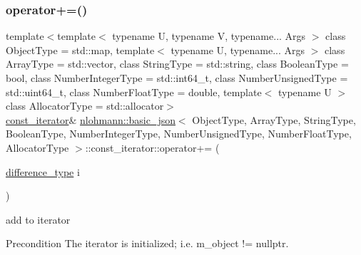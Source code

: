 \subsubsection{\texorpdfstring{operator+=()}{operator+=()}}
{\footnotesize\ttfamily template$<$template$<$ typename U, typename V, typename... Args $>$ class Object\+Type = std\+::map, template$<$ typename U, typename... Args $>$ class Array\+Type = std\+::vector, class String\+Type  = std\+::string, class Boolean\+Type  = bool, class Number\+Integer\+Type  = std\+::int64\+\_\+t, class Number\+Unsigned\+Type  = std\+::uint64\+\_\+t, class Number\+Float\+Type  = double, template$<$ typename U $>$ class Allocator\+Type = std\+::allocator$>$ \\
\hyperlink{classnlohmann_1_1basic__json_1_1const__iterator}{const\+\_\+iterator}\& \hyperlink{classnlohmann_1_1basic__json}{nlohmann\+::basic\+\_\+json}$<$ Object\+Type, Array\+Type, String\+Type, Boolean\+Type, Number\+Integer\+Type, Number\+Unsigned\+Type, Number\+Float\+Type, Allocator\+Type $>$\+::const\+\_\+iterator\+::operator+= (\begin{DoxyParamCaption}\item[{\hyperlink{classnlohmann_1_1basic__json_1_1const__iterator_a49d7c3e9ef3280df03052cce988b792f}{difference\+\_\+type}}]{i }\end{DoxyParamCaption})\hspace{0.3cm}{\ttfamily [inline]}}



add to iterator 

\begin{DoxyPrecond}{Precondition}
The iterator is initialized; i.\+e. {\ttfamily m\+\_\+object != nullptr}. 
\end{DoxyPrecond}
\hypertarget{classnlohmann_1_1basic__json_1_1const__iterator_abc4552ba2fe39e7901a83dd6d4dec151}{}\label{classnlohmann_1_1basic__json_1_1const__iterator_abc4552ba2fe39e7901a83dd6d4dec151} 
